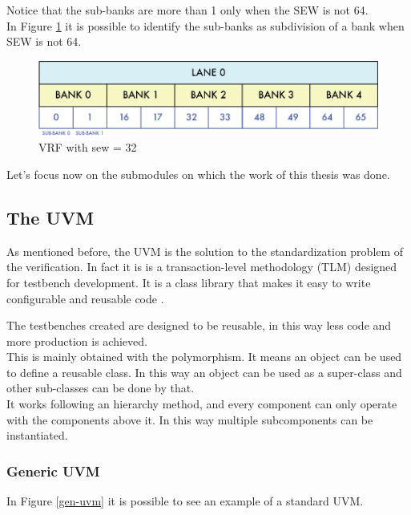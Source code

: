 Notice that the sub-banks are more than 1 only when the SEW is not 64. \\

In Figure \ref{vrf-32} it is possible to identify the sub-banks as subdivision of a bank when SEW is not 64.
\begin{figure}[H]
    \centering
    \includegraphics[scale = 0.7]{Chapter_1/img/vrf-32.png}
    \caption{VRF with sew = 32}
    \label{vrf-32}
\end{figure}

Let's focus now on the submodules on which the work of this thesis was done.




\subsection{The UVM}
As mentioned before, the UVM is the solution to the standardization problem of the verification. In fact it is is a transaction-level methodology (TLM) designed for testbench development. It is a class library that makes it easy to write configurable and reusable code \cite{verification-book-2018}.

The testbenches created are designed to be reusable, in this way less code and more production is achieved.\\

This is mainly obtained with the polymorphism. It means an object can be used to define a reusable class. In this way an object can be used as a super-class and other sub-classes can be done by that.\\

It works following an hierarchy method, and every component can only operate with the components above it. In this way multiple subcomponents can be instantiated.\\

\subsubsection{Generic UVM}
In Figure \ref{gen-uvm} it is possible to see an example of a standard UVM.

